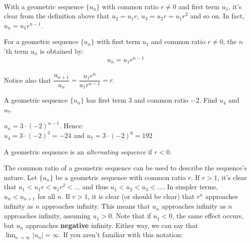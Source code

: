 \documentclass[12pt, a4paper, titlepage, twoside]{article}
\newcounter{excount}[subsection]
\begin{document}
	\paragraph{}
	With a geometric sequence $\{u_n\}$ with common ratio $r \neq 0$ and first term $u_1$, it's clear from the definition above
	that $u_2 = u_1 r$, $u_3 = u_2 r = u_1 r^2$ and so on. In fact, $u_n = u_1 r^{n-1}$.\\
	
	\begin{kp}
		For a geometric sequence $\{u_n\}$ with first term $u_1$ and common ratio $r \neq 0$, the $n$'th term $u_n$ is obtained by: 
		$$u_n = u_1 r^{n-1}$$
	\end{kp}
	
	\paragraph{}
	Notice also that $\dfrac{u_{n+1}}{u_n} = \dfrac{u_1 r^n} {u_1 r^{n-1}} = r$.\\
	
	\begin{ex}
		A geometric sequence $\{u_n\}$ has first term $3$ and common ratio $-2$. Find $u_4$ and $u_7$.
		
		\tcbline
		\hfill
		
		$u_n = 3 \cdot (-2)^{n-1}$. Hence: \\
		$u_4 = 3 \cdot (-2)^{3} = -24$ and $u_7 = 3 \cdot (-2)^{6} = 192$ 
	\end{ex}
	
	\hfill
	
	\begin{kp}
		A geometric sequence is an \textit{alternating sequence} if $r < 0$.
	\end{kp}
	
	The common ratio of a geometric sequence can be used to describe the sequence's nature. Let $\{u_n\}$ be a geometric
	sequence with common ratio $r$. If $r > 1$, it's clear that $u_1 < u_1 r < u_1 r^2 < ...$ and thus $u_1 < u_2 < u_3 < ...$.
	In simpler terms, $u_n < u_{n+1}$ for all $n$.
	If $r >1$, it is clear (or should be clear) that $r^n$ approaches infinity as $n$ approaches infinity.
	This means that $u_n$ approaches infinity as $n$ approaches infinity, assuming $u_1 > 0$. Note that if $u_1 < 0$, the
	same effect occurs, but $u_n$ approaches \textbf{negative} infinity. Either way, we can say that $\displaystyle 
	\lim_{n \to \infty} |u_n| = \infty$. If you aren't familiar with this notation:\\
	
\end{document}
